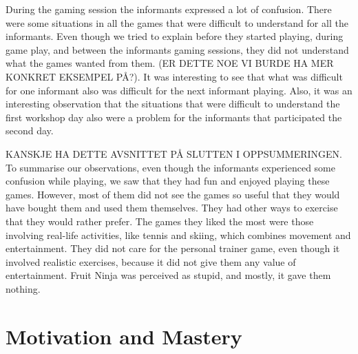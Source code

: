 During the gaming session the informants expressed a lot of confusion. There were some situations in all the games that were difficult to understand for all the informants. Even though we tried to explain before they started playing, during game play, and between the informants gaming sessions, they did not understand what the games wanted from them. (ER DETTE NOE VI BURDE HA MER KONKRET EKSEMPEL PÅ?). It was interesting to see that what was difficult for one informant also was difficult for the next informant playing. Also, it was an interesting observation that the situations that were difficult to understand the first workshop day also were a problem for the informants that participated the second day. 

KANSKJE HA DETTE AVSNITTET PÅ SLUTTEN I OPPSUMMERINGEN. 
To summarise our observations, even though the informants experienced some confusion while playing, we saw that they had fun and enjoyed playing these games. However, most of them did not see the games so useful that they would have bought them and used them themselves. They had other ways to exercise that they would rather prefer. The games they liked the most were those involving real-life activities, like tennis and skiing, which combines movement and entertainment. They did not care for the personal trainer game, even though it involved realistic exercises, because it did not give them any value of entertainment. Fruit Ninja was perceived as stupid, and mostly, it gave them nothing.   

\section{Motivation and Mastery}

